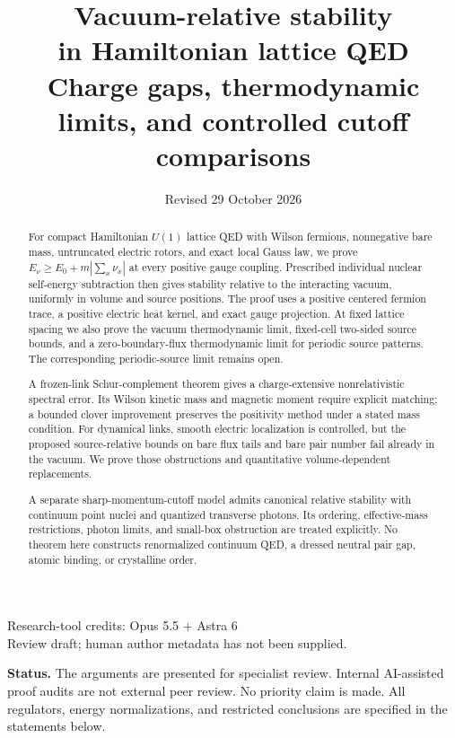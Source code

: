 \documentclass[11pt,letterpaper]{article}
\title{\textbf{Vacuum-relative stability\\in Hamiltonian lattice QED}\\[0.4em]
\large Charge gaps, thermodynamic limits, and controlled cutoff comparisons}
\author{}
\date{Revised 29 October 2026}
\numberwithin{equation}{section}
\theoremstyle{remark}
\begin{document}
\maketitle
\begin{center}
\small Research-tool credits: Opus 5.5 + Astra 6\\
Review draft; human author metadata has not been supplied.
\end{center}
\begin{abstract}
For compact Hamiltonian $U(1)$ lattice QED with Wilson fermions,
nonnegative bare mass, untruncated electric rotors, and exact local
Gauss law, we prove $E_\nu\ge E_0+m|\sum_x\nu_x|$ at every positive
gauge coupling. Prescribed individual nuclear self-energy subtraction
then gives stability relative to the interacting vacuum, uniformly in
volume and source positions. The proof uses a positive centered
fermion trace, a positive electric heat kernel, and exact gauge
projection. At fixed lattice spacing we also prove the vacuum
thermodynamic limit, fixed-cell two-sided source bounds, and a
zero-boundary-flux thermodynamic limit for periodic source patterns.
The corresponding periodic-source limit remains open.

A frozen-link Schur-complement theorem gives a charge-extensive
nonrelativistic spectral error. Its Wilson kinetic mass and magnetic
moment require explicit matching; a bounded clover improvement
preserves the positivity method under a stated mass condition.
For dynamical links, smooth electric localization is controlled, but
the proposed source-relative bounds on bare flux tails and bare
pair number fail already in the vacuum. We prove those obstructions
and quantitative volume-dependent replacements.

A separate sharp-momentum-cutoff model admits canonical relative
stability with continuum point nuclei and quantized transverse
photons. Its ordering, effective-mass restrictions, photon limits,
and small-box obstruction are treated explicitly. No theorem here
constructs renormalized continuum QED, a dressed neutral pair gap,
atomic binding, or crystalline order.
\end{abstract}
\noindent\textbf{Status.}
The arguments are presented for specialist review. Internal AI-assisted
proof audits are not external peer review. No priority claim is made.
All regulators, energy normalizations, and restricted conclusions
are specified in the statements below.
\clearpage
\tableofcontents
\clearpage










\appendix




\end{document}
